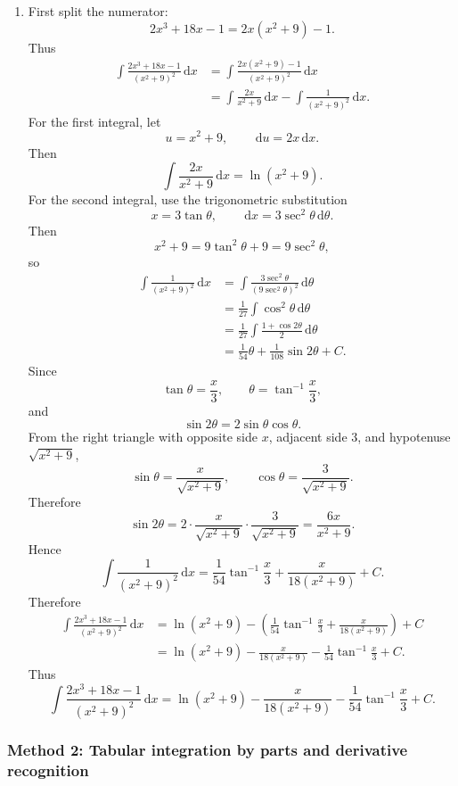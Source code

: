 \documentclass[12pt]{article}
\newcommand{\dd}{\,\mathrm{d}}
\begin{document}
\begin{enumerate}[label=(\alph*)]
\item First split the numerator:
\[
2x^3+18x-1=2x(x^2+9)-1.
\]
Thus
\begin{align*}
\int \frac{2x^3+18x-1}{(x^2+9)^2}\dd x
&=\int \frac{2x(x^2+9)-1}{(x^2+9)^2}\dd x\\
&=\int \frac{2x}{x^2+9}\dd x-\int \frac{1}{(x^2+9)^2}\dd x.
\end{align*}
For the first integral, let
\[
u=x^2+9,\qquad \dd u=2x\dd x.
\]
Then
\[
\int \frac{2x}{x^2+9}\dd x=\ln(x^2+9).
\]
For the second integral, use the trigonometric substitution
\[
x=3\tan\theta,\qquad \dd x=3\sec^2\theta\dd\theta.
\]
Then
\[
x^2+9=9\tan^2\theta+9=9\sec^2\theta,
\]
so
\begin{align*}
\int \frac{1}{(x^2+9)^2}\dd x
&=\int \frac{3\sec^2\theta}{(9\sec^2\theta)^2}\dd\theta\\
&=\frac{1}{27}\int \cos^2\theta\dd\theta\\
&=\frac{1}{27}\int \frac{1+\cos 2\theta}{2}\dd\theta\\
&=\frac{1}{54}\theta+\frac{1}{108}\sin 2\theta+C.
\end{align*}
Since
\[
\tan\theta=\frac{x}{3},
\qquad
\theta=\tan^{-1}\frac{x}{3},
\]
and
\[
\sin 2\theta=2\sin\theta\cos\theta.
\]
From the right triangle with opposite side $x$, adjacent side $3$, and hypotenuse $\sqrt{x^2+9}$,
\[
\sin\theta=\frac{x}{\sqrt{x^2+9}},
\qquad
\cos\theta=\frac{3}{\sqrt{x^2+9}}.
\]
Therefore
\[
\sin 2\theta
=2\cdot \frac{x}{\sqrt{x^2+9}}\cdot \frac{3}{\sqrt{x^2+9}}
=\frac{6x}{x^2+9}.
\]
Hence
\[
\int \frac{1}{(x^2+9)^2}\dd x
=\frac{1}{54}\tan^{-1}\frac{x}{3}+\frac{x}{18(x^2+9)}+C.
\]
Therefore
\begin{align*}
\int \frac{2x^3+18x-1}{(x^2+9)^2}\dd x
&=\ln(x^2+9)-\left(\frac{1}{54}\tan^{-1}\frac{x}{3}+\frac{x}{18(x^2+9)}\right)+C\\
&=\ln(x^2+9)-\frac{x}{18(x^2+9)}-\frac{1}{54}\tan^{-1}\frac{x}{3}+C.
\end{align*}
Thus
\[
\boxed{\int \frac{2x^3+18x-1}{(x^2+9)^2}\dd x
=\ln(x^2+9)-\frac{x}{18(x^2+9)}-\frac{1}{54}\tan^{-1}\frac{x}{3}+C.}
\]
\end{enumerate}

\newpage
\subsubsection{Method 2: Tabular integration by parts and derivative recognition}
\end{document}
